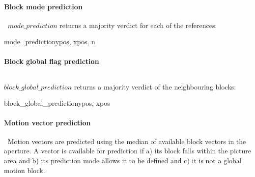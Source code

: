 \paragraph{Block mode prediction}
\label{modeprediction}
$\ $\newline
$mode\_prediction$ returns a majority verdict for each of the references:

\begin{pseudo}{mode\_prediction}{ypos, xpos, n}
    \bsRET{\false}
    \bsRET{\BlockData[ypos][xpos-1][mode][n]}
    \bsRET{\BlockData[ypos-1][xpos][mode][n]}
\bsEND
{}

\end{pseudo}

\paragraph{Block global flag prediction}
\label{blockglobalprediction}
$\ $\newline

$block\_global\_prediction$ returns a majority verdict of the neighbouring blocks:

\begin{pseudo}{block\_global\_prediction}{ypos, xpos}
    \bsRET{\false}
    \bsRET{\BlockData[ypos][xpos-1][global]}
    \bsRET{\BlockData[ypos-1][xpos][global]}
\bsEND


\end{pseudo}

\paragraph{Motion vector prediction}
\label{mvprediction}
$\ $\newline
Motion vectors are predicted using the median of available block vectors in the aperture. A vector is available for
prediction if a) its block falls within the picture area and b) its prediction mode allows it to be defined and c) it
is not a global motion block. 

